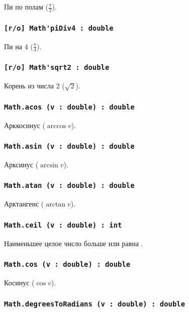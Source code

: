 Пи по полам ($\frac{\pi}{2}$).

\subsubsection{\lstinline|[r/o] Math'piDiv4 : double|}

Пи на 4 ($\frac{\pi}{4}$).

\subsubsection{\lstinline|[r/o] Math'sqrt2 : double|}

Корень из числа 2 ($\sqrt{2}$).

\subsubsection{\lstinline|Math.acos (v : double) : double|}

Арккосинус ($\arccos{v}$).

\subsubsection{\lstinline|Math.asin (v : double) : double|}

Арксинус ($\arcsin{v}$).

\subsubsection{\lstinline|Math.atan (v : double) : double|}

Арктангенс ($\arctan{v}$).

\subsubsection{\lstinline|Math.ceil (v : double) : int|}

Наименьшее целое число больше или равна .

\subsubsection{\lstinline|Math.cos (v : double) : double|}

Косинус ($\cos{v}$).

\subsubsection{\lstinline|Math.degreesToRadians (v : double) : double|}

